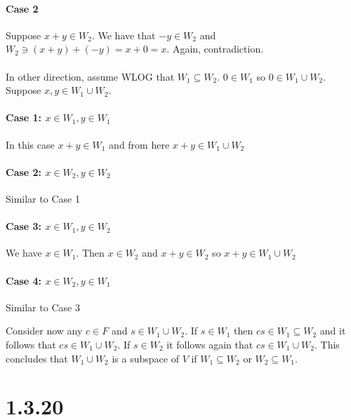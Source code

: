 \documentclass{article}
\begin{document}
\paragraph{Case 2}
Suppose \(x + y \in W_{2}\). We have that \(-y \in W_{2}\) and \(W_{2} \ni (x + y) + (-y) = x + 0 = x \). Again, contradiction.

\paragraph{}
In other direction, assume WLOG that \(W_{1} \subseteq W_{2}\). \(0 \in W_{1}\) so \(0 \in W_{1} \cup W_{2}\). Suppose \(x, y \in W_{1} \cup W_{2}\).

\paragraph{Case 1: \(x \in W_{1}, y \in W_{1}\)}
In this case \(x + y \in W_{1}\) and from here \(x + y \in W_{1} \cup W_{2}\)

\paragraph{Case 2: \(x \in W_{2}, y \in W_{2}\)}

Similar to Case 1

\paragraph{Case 3: \(x \in W_{1}, y \in W_{2}\)}

We have \(x \in W_{1}\). Then \(x \in W_{2}\) and \(x + y \in W_{2}\) so \(x + y \in W_{1} \cup W_{2}\)

\paragraph{Case 4: \(x \in W_{2}, y \in W_{1}\)}

Similar to Case 3

\vspace{5mm}

Consider now any \(c \in F\) and \(s \in W_{1} \cup W_{2}\). If \(s \in W_{1}\) then \(cs \in W_{1} \subseteq W_{2}\) and it follows that \(cs \in W_{1} \cup W_{2}\).
If \(s \in W_{2}\) it follows again that \(cs \in W_{1} \cup W_{2}\).
This concludes that \(W_{1} \cup W_{2}\) is a subspace of \(V\) if \(W_{1} \subseteq W_{2}\) or \(W_{2} \subseteq W_{1}\).

\section*{1.3.20}
\end{document}
